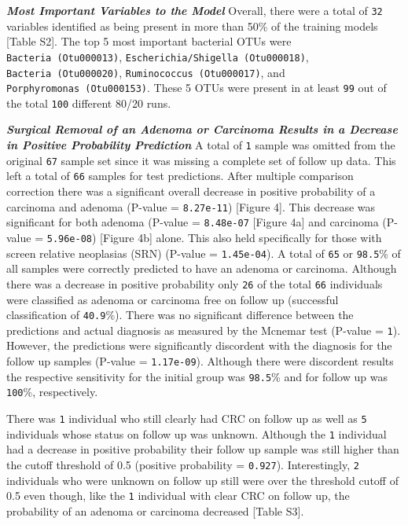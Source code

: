\documentclass[12pt,]{article}
\begin{document}
\textbf{\emph{Most Important Variables to the Model}} Overall, there
were a total of \texttt{32} variables identified as being present in
more than 50\% of the training models {[}Table S2{]}. The top 5 most
important bacterial OTUs were \texttt{Bacteria\ (Otu000013)},
\texttt{Escherichia/Shigella\ (Otu000018)},
\texttt{Bacteria\ (Otu000020)}, \texttt{Ruminococcus\ (Otu000017)}, and
\texttt{Porphyromonas\ (Otu000153)}. These 5 OTUs were present in at
least \texttt{99} out of the total \texttt{100} different 80/20 runs.

\textbf{\emph{Surgical Removal of an Adenoma or Carcinoma Results in a
Decrease in Positive Probability Prediction}} A total of \texttt{1}
sample was omitted from the original \texttt{67} sample set since it was
missing a complete set of follow up data. This left a total of
\texttt{66} samples for test predictions. After multiple comparison
correction there was a significant overall decrease in positive
probability of a carcinoma and adenoma (P-value = \texttt{8.27e-11})
{[}Figure 4{]}. This decrease was significant for both adenoma (P-value
= \texttt{8.48e-07} {[}Figure 4a{]} and carcinoma (P-value =
\texttt{5.96e-08}) {[}Figure 4b{]} alone. This also held specifically
for those with screen relative neoplasias (SRN) (P-value =
\texttt{1.45e-04}). A total of \texttt{65} or \texttt{98.5}\% of all
samples were correctly predicted to have an adenoma or carcinoma.
Although there was a decrease in positive probability only \texttt{26}
of the total \texttt{66} individuals were classified as adenoma or
carcinoma free on follow up (successful classification of
\texttt{40.9}\%). There was no significant difference between the
predictions and actual diagnosis as measured by the Mcnemar test
(P-value = \texttt{1}). However, the predictions were significantly
discordent with the diagnosis for the follow up samples (P-value =
\texttt{1.17e-09}). Although there were discordent results the
respective sensitivity for the initial group was \texttt{98.5}\% and for
follow up was \texttt{100}\%, respectively.

There was \texttt{1} individual who still clearly had CRC on follow up
as well as \texttt{5} individuals whose status on follow up was unknown.
Although the \texttt{1} individual had a decrease in positive
probability their follow up sample was still higher than the cutoff
threshold of 0.5 (positive probability = \texttt{0.927}). Interestingly,
\texttt{2} individuals who were unknown on follow up still were over the
threshold cutoff of 0.5 even though, like the \texttt{1} individual with
clear CRC on follow up, the probability of an adenoma or carcinoma
decreased {[}Table S3{]}.
\end{document}

